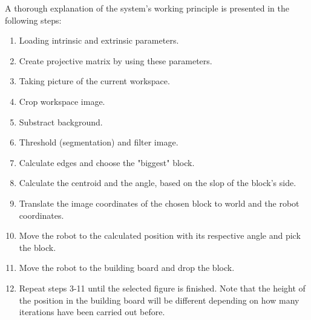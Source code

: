 A thorough explanation of the system's working principle is presented in the following steps:   
\begin{enumerate}
	\item Loading intrinsic and extrinsic parameters.
	\item Create projective matrix by using these parameters.
	\item Taking picture of the current workspace.
	\item Crop workspace image. 
	\item Substract background.
	\item Threshold (segmentation) and filter image.
	\item Calculate edges and choose the "biggest" block.
	\item Calculate the centroid and the angle, based on the slop of the block's side.
	\item Translate the image coordinates of the chosen block to world and the robot coordinates.
	\item Move the robot to the calculated position with its respective angle and pick the block.
	\item Move the robot to the building board and drop the block.
	\item Repeat steps 3-11 until the selected figure is finished. Note that the height of the position in the building board will be different depending on how many iterations have been carried out before.
\end{enumerate}